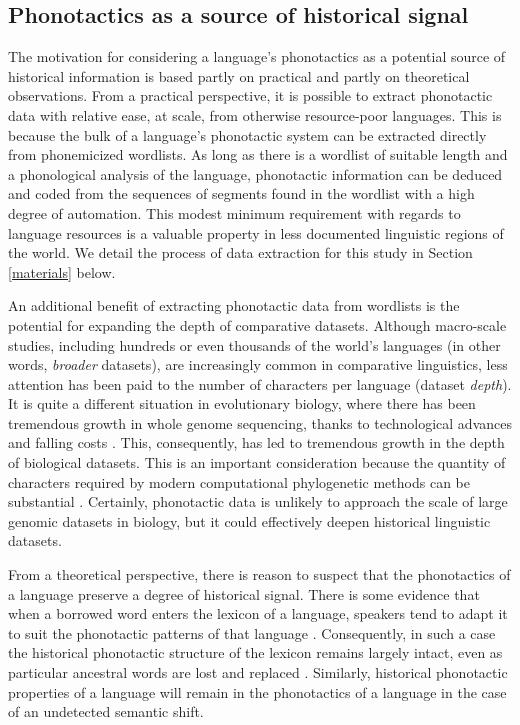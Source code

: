 \hypertarget{why-phonotactics}{%
\subsection{Phonotactics as a source of historical signal}\label{why-phonotactics}}

The motivation for considering a language's phonotactics as a potential source of historical information is based partly on practical and partly on theoretical observations. From a practical perspective, it is possible to extract phonotactic data with relative ease, at scale, from otherwise resource-poor languages. This is because the bulk of a language's phonotactic system can be extracted directly from phonemicized wordlists. As long as there is a wordlist of suitable length \autocite{dockum_swadesh_2019} and a phonological analysis of the language, phonotactic information can be deduced and coded from the sequences of segments found in the wordlist with a high degree of automation. This modest minimum requirement with regards to language resources is a valuable property in less documented linguistic regions of the world. We detail the process of data extraction for this study in Section \ref{materials} below.

An additional benefit of extracting phonotactic data from wordlists is the potential for expanding the depth of comparative datasets. Although macro-scale studies, including hundreds or even thousands of the world's languages (in other words, \emph{broader} datasets), are increasingly common in comparative linguistics, less attention has been paid to the number of characters per language (dataset \emph{depth}). It is quite a different situation in evolutionary biology, where there has been tremendous growth in whole genome sequencing, thanks to technological advances and falling costs \autocites{delsuc_phylogenomics_2005}{wortley_how_2005}. This, consequently, has led to tremendous growth in the depth of biological datasets. This is an important consideration because the quantity of characters required by modern computational phylogenetic methods can be substantial \autocites{wortley_how_2005}{marin_undersampling_2018}. Certainly, phonotactic data is unlikely to approach the scale of large genomic datasets in biology, but it could effectively deepen historical linguistic datasets.

From a theoretical perspective, there is reason to suspect that the phonotactics of a language preserve a degree of historical signal. There is some evidence that when a borrowed word enters the lexicon of a language, speakers tend to adapt it to suit the phonotactic patterns of that language \autocites{hyman_role_1970}{silverman_multiple_1992}{crawford_adaptation_2009}{kang_loanword_2011}. Consequently, in such a case the historical phonotactic structure of the lexicon remains largely intact, even as particular ancestral words are lost and replaced \autocite[a property termed \emph{pertinacity} by][]{dresher_main_2005}. Similarly, historical phonotactic properties of a language will remain in the phonotactics of a language in the case of an undetected semantic shift.

